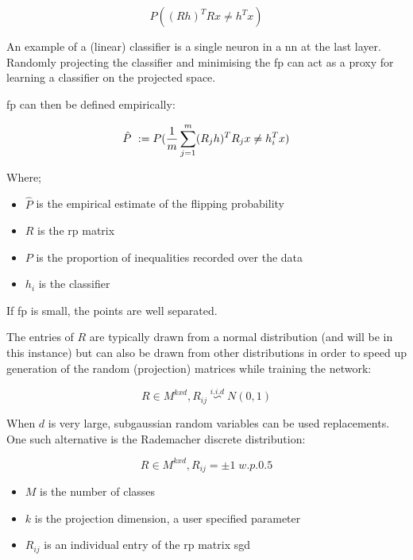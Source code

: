 \begin{equation}
P((R h)^T Rx \neq h^{T}x)  
\end{equation}

An example of a (linear) classifier is a single neuron in a \gls{nn} at the last layer. Randomly projecting the classifier and minimising the \gls{fp} can act as a proxy for learning a classifier on the projected space. \smallskip

 \gls{fp} can then be defined empirically:

\begin{equation}
\hat{P}\ := \\ P(\frac{1}{m}\sum_{j = 1}^m (R_j h)^T R_{j}x \neq h_i^{T}x)  
\end{equation}

Where;  \smallskip

\begin{itemize}
\item $\hat{P}$ is the empirical estimate of the flipping probability  
\item $R$ is the \gls{rp} matrix  
\item $P$ is the proportion of inequalities recorded over the data 
\item $h_i$ is the classifier  
\end{itemize}

If  \gls{fp} is small, the points are well separated. \bigskip

The entries of $R$ are typically drawn from a normal distribution (and will be in this instance) but can also be drawn from other distributions in order to speed up generation of the random (projection) matrices while training the network:

\begin{equation}
R \in M^{kxd}, R_{ij} \stackrel{i.i.d}{\backsim} N(0,1) 
\end{equation}

When $d$ is very large, subgaussian random variables can be used replacements. One such alternative is the Rademacher discrete distribution:

\begin{equation}
R \in M^{kxd}, R_{ij} = \pm 1 \; w.p. 0.5 
\end{equation}

\begin{itemize}
\item $M$ is the number of classes  
\item $k$ is the projection dimension, a user specified parameter 
\item $R_{ij}$ is an individual entry of the \gls{rp} matrix  \gls{sgd}  
\end{itemize}

